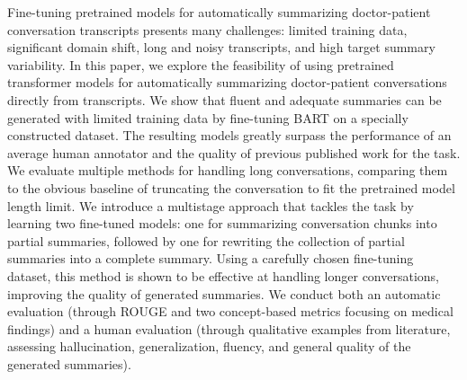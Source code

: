Fine-tuning pretrained models for automatically summarizing doctor-patient conversation transcripts presents many challenges: limited training data, significant domain shift, long and noisy transcripts, and high target summary variability. In this paper, we explore the feasibility of using pretrained transformer models for automatically summarizing doctor-patient conversations directly from transcripts. We show that fluent and adequate summaries can be generated with limited training data by fine-tuning BART on a specially constructed dataset. The resulting models greatly surpass the performance of an average human annotator and the quality of previous published work for the task. We evaluate multiple methods for handling long conversations, comparing them to the obvious baseline of truncating the conversation to fit the pretrained model length limit. We introduce a multistage approach that tackles the task by learning two fine-tuned models: one for summarizing conversation chunks into partial summaries, followed by one for rewriting the collection of partial summaries into a complete summary. Using a carefully chosen fine-tuning dataset, this method is shown to be effective at handling longer conversations, improving the quality of generated summaries. We conduct both an automatic evaluation (through ROUGE and two concept-based metrics focusing on medical findings) and a human evaluation (through qualitative examples from literature, assessing hallucination, generalization, fluency, and general quality of the generated summaries).
